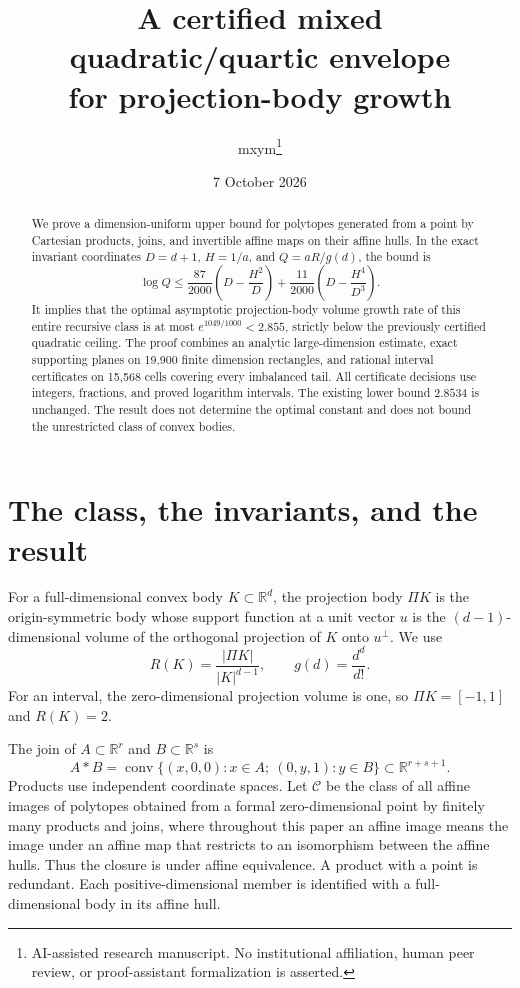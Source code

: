 \documentclass[11pt]{article}
\title{A certified mixed quadratic/quartic envelope\protect\\for projection-body growth}
\author{mxym\thanks{AI-assisted research manuscript. No institutional affiliation, human peer review, or proof-assistant formalization is asserted.}}
\date{7 October 2026}
\theoremstyle{remark}
\newcommand{\CC}{\mathcal C}
\newcommand{\RR}{\mathbb R}
\DeclareMathOperator{\conv}{conv}
\begin{document}
\maketitle
\begin{abstract}
We prove a dimension-uniform upper bound for polytopes generated from a point by Cartesian products, joins, and invertible affine maps on their affine hulls. In the exact invariant coordinates $D=d+1$, $H=1/a$, and $Q=aR/g(d)$, the bound is
\[
 \log Q\le\frac{87}{2000}\left(D-\frac{H^2}{D}\right)
 +\frac{11}{2000}\left(D-\frac{H^4}{D^3}\right).
\]
It implies that the optimal asymptotic projection-body volume growth rate of this entire recursive class is at most $e^{1049/1000}<2.855$, strictly below the previously certified quadratic ceiling. The proof combines an analytic large-dimension estimate, exact supporting planes on 19,900 finite dimension rectangles, and rational interval certificates on 15,568 cells covering every imbalanced tail. All certificate decisions use integers, fractions, and proved logarithm intervals. The existing lower bound $2.8534$ is unchanged. The result does not determine the optimal constant and does not bound the unrestricted class of convex bodies.
\end{abstract}

\section{The class, the invariants, and the result}

For a full-dimensional convex body $K\subset\RR^d$, the projection body $\Pi K$ is the origin-symmetric body whose support function at a unit vector $u$ is the $(d-1)$-dimensional volume of the orthogonal projection of $K$ onto $u^\perp$. We use
\[
 R(K)=\frac{|\Pi K|}{|K|^{d-1}},\qquad g(d)=\frac{d^d}{d!}.
\]
For an interval, the zero-dimensional projection volume is one, so $\Pi K=[-1,1]$ and $R(K)=2$.

The join of $A\subset\RR^r$ and $B\subset\RR^s$ is
\[
 A*B=\conv\bigl\{(x,0,0):x\in A;\ (0,y,1):y\in B\bigr\}
 \subset\RR^{r+s+1}.
\]
Products use independent coordinate spaces. Let $\CC$ be the class of all affine images of polytopes obtained from a formal zero-dimensional point by finitely many products and joins, where throughout this paper an affine image means the image under an affine map that restricts to an isomorphism between the affine hulls. Thus the closure is under affine equivalence. A product with a point is redundant. Each positive-dimensional member is identified with a full-dimensional body in its affine hull.
\end{document}
